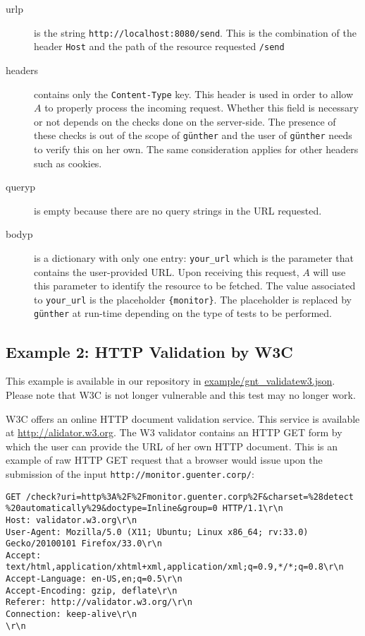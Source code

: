 \documentclass[10pt,a4paper]{article}
\newcommand{\g}{\texttt{g\"{u}nther}}
\begin{document}
 \begin{description}
 
   \item[urlp] is the string \texttt{http://localhost:8080/send}. This is the
   combination of the header \texttt{Host} and the path of the resource
   requested \texttt{/send}
   
   \item[headers] contains only the \texttt{Content-Type} key. This header is
   used in order to allow $A$ to properly process the incoming request. Whether
   this field is necessary or not depends on the checks done on the server-side.
   The presence of these checks is out of the scope of \g{} and the user of \g{}
   needs to verify this on her own. The same consideration applies for other
   headers such as cookies.
 
   \item[queryp] is empty because there are no query strings in the URL
   requested.
   
   \item[bodyp] is a dictionary with only one entry: \texttt{your\_url} which is
   the parameter that contains the user-provided URL. Upon receiving this
   request, $A$ will use this parameter to identify the resource to be fetched.
   The value associated to \texttt{your\_url} is the placeholder
   \texttt{\{monitor\}}. The placeholder is replaced by \g{} at run-time
   depending on the type of tests to be performed.
   
 
 \end{description}

\subsection{Example 2: HTTP Validation by W3C}

This example is available in our repository in
\url{example/gnt\_validatew3.json}. Please note that W3C is not longer vulnerable and this test may no longer work.

W3C offers an online HTTP document validation service. This service is available
at \url{http://alidator.w3.org}. The W3 validator contains an HTTP GET form by
which the user can provide the URL of her own HTTP document. This is an example
of raw HTTP GET request that a browser would issue upon the submission of the
input \texttt{http://monitor.guenter.corp/}:

\begin{lstlisting}
GET /check?uri=http%3A%2F%2Fmonitor.guenter.corp%2F&charset=%28detect %20automatically%29&doctype=Inline&group=0 HTTP/1.1\r\n
Host: validator.w3.org\r\n
User-Agent: Mozilla/5.0 (X11; Ubuntu; Linux x86_64; rv:33.0) Gecko/20100101 Firefox/33.0\r\n
Accept: text/html,application/xhtml+xml,application/xml;q=0.9,*/*;q=0.8\r\n
Accept-Language: en-US,en;q=0.5\r\n
Accept-Encoding: gzip, deflate\r\n
Referer: http://validator.w3.org/\r\n
Connection: keep-alive\r\n
\r\n
\end{lstlisting}
\end{document}
